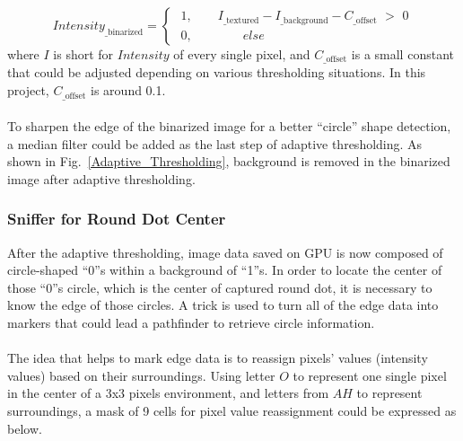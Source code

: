 \begin{equation}
%
Intensity_{\text{\_binarized}} = %
%
\begin{cases}
\,\, 1 , \quad \quad I_{\text{\_textured}} - I_{\text{\_background}}  -  C_{\text{\_offset}} \,\, > \,\,0 %
\\%
\,\, 0 , \quad \quad \quad \quad else%
\end{cases}
%
\end{equation}%
%
where \(I\) is short for \(Intensity\) of every single pixel, and \(C_{\text{\_offset}}\) is a small constant that could be adjusted depending on various thresholding situations. In this project, \(C_{\text{\_offset}}\) is around 0.1.%
\\\\%
To sharpen the edge of the binarized image for a better \enquote{circle} shape detection, a median filter could be added as the last step of adaptive thresholding. As shown in Fig.~\ref{Adaptive_Thresholding}, background is removed in the binarized image after adaptive thresholding.
%
%
\subsubsection{Sniffer for Round Dot Center}
After the adaptive thresholding, image data saved on GPU is now composed of circle-shaped \enquote{0}s within a background of \enquote{1}s. In order to locate the center of those \enquote{0}s circle, which is the center of captured round dot, it is necessary to know the edge of those circles. A trick is used to turn all of the edge data into markers that could lead a pathfinder to retrieve circle information.%
\\\\%
The idea that helps to mark edge data is to reassign pixels' values (intensity values) based on their surroundings. Using letter \(O\) to represent one single pixel in the center of a 3x3 pixels environment, and letters from \(A\)\texttildelow \(H\) to represent surroundings, a mask of 9 cells for pixel value reassignment could be expressed as below.

